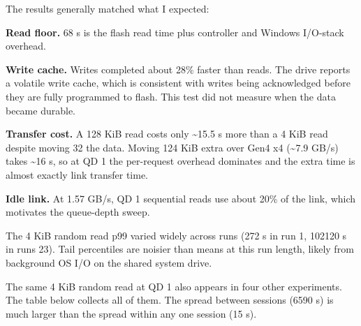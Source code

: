 \documentclass[10pt,letterpaper]{article}
\begin{document}
The results generally matched what I expected:


\noindent \textbullet{} \textbf{Read floor.} 68 \textmu{}s is the flash read time plus controller and Windows I/O-stack overhead.\par\smallskip

\noindent \textbullet{} \textbf{Write cache.} Writes completed about 28\% faster than reads. The drive reports a volatile write cache, which is consistent with writes being acknowledged before they are fully programmed to flash. This test did not measure when the data became durable.\par\smallskip

\noindent \textbullet{} \textbf{Transfer cost.} A 128 KiB read costs only \textasciitilde{}15.5 \textmu{}s more than a 4 KiB read despite moving 32\texttimes{} the data. Moving 124 KiB extra over Gen4 x4 (\textasciitilde{}7.9 GB/s) takes \textasciitilde{}16 \textmu{}s, so at QD 1 the per-request overhead dominates and the extra time is almost exactly link transfer time.\par\smallskip

\noindent \textbullet{} \textbf{Idle link.} At 1.57 GB/s, QD 1 sequential reads use about 20\% of the link, which motivates the queue-depth sweep.\par\smallskip

The 4 KiB random read p99 varied widely across runs (272 \textmu{}s in run 1, 102\textendash{}120 \textmu{}s in runs 2\textendash{}3). Tail percentiles are noisier than means at this run length, likely from background OS I/O on the shared system drive.


The same 4 KiB random read at QD 1 also appears in four other experiments. The table below collects all of them. The spread between sessions (65\textendash{}90 \textmu{}s) is much larger than the spread within any one session (\textpm{}1\textendash{}5 \textmu{}s).
\end{document}

